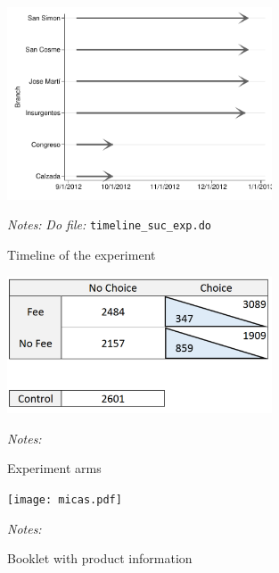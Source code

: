 \documentclass[11pt]{article}
\begin{document}
\begin{figure}[H]
        \caption{Timeline of the experiment}
    \label{micas}
    \begin{center}
        \centering
        \includegraphics[width=0.70\textwidth]{Figuras/timeline_suc_exp.pdf}
    \end{center}
     \footnotesize \textit{Notes: } 
      \footnotesize{ \textit{Do file: }  \texttt{timeline\_suc\_exp.do}}
\end{figure}


\begin{figure}[H]
        \caption{Experiment arms}
    \label{micas}
    \begin{center}
        \centering
        \includegraphics[width=0.70\textwidth]{Figuras/exp_arms.pdf}
    \end{center}
     \footnotesize \textit{Notes: } 
      \footnotesize{ }
\end{figure}


\begin{figure}[H]
        \caption{Booklet with product information}
    \label{micas}
    \begin{center}
        \centering
        \texttt{[image: micas.pdf]}
    \end{center}
     \footnotesize \textit{Notes: } 
      \footnotesize{ }
\end{figure}
\end{document}
